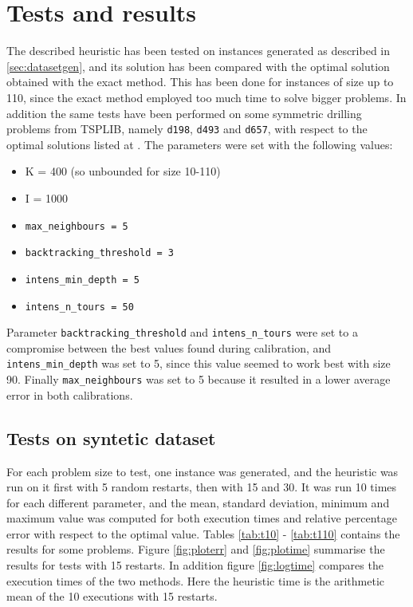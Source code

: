 
\section{Tests and results}
\label{sec:results}
The described heuristic has been tested on instances generated as described in \cref{sec:datasetgen}, and its solution has been compared with the optimal solution obtained with the exact method. This has been done for instances of size up to 110, since the exact method employed too much time to solve bigger problems. In addition the same tests have been performed on some symmetric drilling problems from TSPLIB, namely \texttt{d198}, \texttt{d493} and \texttt{d657}, with respect to the optimal solutions listed at \cite{Tsplibsol}.
The parameters were set with the following values:
\begin{itemize}
	\setlength\itemsep{0.03em}
	\item K = 400 (so unbounded for size 10-110)
	\item I = 1000
	\item \texttt{max\_neighbours = 5}
	\item \texttt{backtracking\_threshold = 3}
	\item \texttt{intens\_min\_depth = 5}
	\item \texttt{intens\_n\_tours = 50}
\end{itemize}
Parameter \texttt{backtracking\_threshold} and \texttt{intens\_n\_tours} were set to a compromise between the best values found during calibration, and \texttt{intens\_min\_depth} was set to 5, since this value seemed to work best with size 90. Finally \texttt{max\_neighbours} was set to 5 because it resulted in a lower average error in both calibrations.

\subsection{Tests on syntetic dataset}
For each problem size to test, one instance was generated, and the heuristic was run on it first with 5 random restarts, then with 15 and 30. It was run 10 times for each different parameter, and the mean, standard deviation, minimum and maximum value was computed for both execution times and relative percentage error with respect to the optimal value. Tables \ref{tab:t10} - \ref{tab:t110} contains the results for some problems. Figure \ref{fig:ploterr} and \ref{fig:plotime} summarise the results for tests with 15 restarts. In addition figure \ref{fig:logtime} compares the execution times of the two methods. Here the heuristic time is the arithmetic mean of the 10 executions with 15 restarts.

